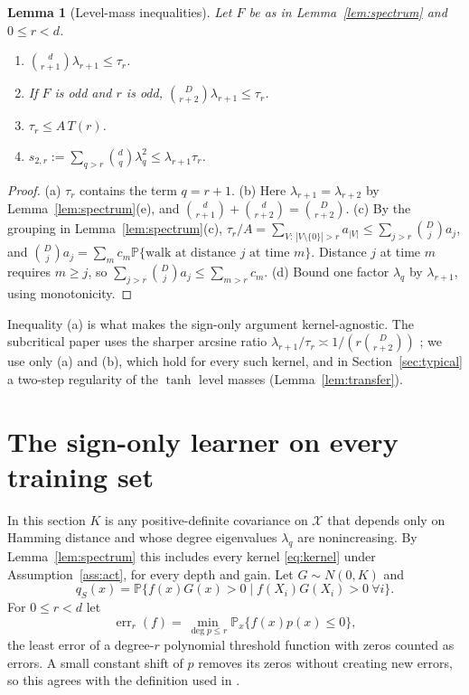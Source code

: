\documentclass[11pt]{article}
\newtheorem{lemma}[theorem]{Lemma}
\theoremstyle{definition}\newtheorem{assumption}[theorem]{Assumption}
\theoremstyle{remark}\newtheorem{remark}[theorem]{Remark}
\DeclareMathOperator{\err}{err}
\newcommand{\Pp}{\mathbb P}
\newcommand{\X}{\mathcal X}
\begin{document}
\begin{lemma}[Level-mass inequalities]\label{lem:levels}
Let $F$ be as in Lemma~\ref{lem:spectrum} and $0\le r<d$.
\begin{enumerate}
\item[(a)] $\binom d{r+1}\lambda_{r+1}\le\tau_r$.
\item[(b)] If $F$ is odd and $r$ is odd, $\binom D{r+2}\lambda_{r+1}\le\tau_r$.
\item[(c)] $\tau_r\le A\,T(r)$.
\item[(d)] $s_{2,r}:=\sum_{q>r}\binom dq\lambda_q^2\le\lambda_{r+1}\tau_r$.
\end{enumerate}
\end{lemma}
\begin{proof}
(a) $\tau_r$ contains the term $q=r+1$. (b) Here $\lambda_{r+1}=\lambda_{r+2}$
by Lemma~\ref{lem:spectrum}(e), and
$\binom d{r+1}+\binom d{r+2}=\binom D{r+2}$. (c) By the grouping in
Lemma~\ref{lem:spectrum}(c),
$\tau_r/A=\sum_{V:\,|V\setminus\{0\}|>r}a_{|V|}\le\sum_{j>r}\binom Dja_j$,
and $\binom Dja_j=\sum_mc_m\Pp\{\text{walk at distance $j$ at time $m$}\}$.
Distance $j$ at time $m$ requires $m\ge j$, so
$\sum_{j>r}\binom Dja_j\le\sum_{m>r}c_m$. (d) Bound one factor
$\lambda_q$ by $\lambda_{r+1}$, using monotonicity.
\end{proof}

Inequality (a) is what makes the sign-only argument kernel-agnostic. The
subcritical paper uses the sharper arcsine ratio
$\lambda_{r+1}/\tau_r\asymp1/(r\binom D{r+2})$ \cite[Lemma~3.2]{subcritical};
we use only (a) and (b), which hold for every such kernel, and in
Section~\ref{sec:typical} a two-step regularity of the $\tanh$ level
masses (Lemma~\ref{lem:transfer}).

\section{The sign-only learner on every training set}
\label{sec:signonly}
In this section $K$ is any positive-definite covariance on $\X$ that
depends only on Hamming distance and whose degree eigenvalues
$\lambda_q$ are nonincreasing. By Lemma~\ref{lem:spectrum} this includes
every kernel \eqref{eq:kernel} under Assumption~\ref{ass:act}, for every
depth and gain. Let $G\sim N(0,K)$ and
\[
 q_S(x)=\Pp\{f(x)G(x)>0\mid f(X_i)G(X_i)>0\ \forall i\}.
\]
For $0\le r<d$ let
\[
 \err_r(f)=\min_{\deg p\le r}\Pp_x\{f(x)p(x)\le0\},
\]
the least error of a degree-$r$ polynomial threshold function with zeros
counted as errors. A small constant shift of $p$ removes its zeros without
creating new errors, so this agrees with the definition used in
\cite{beyondparity}.
\end{document}
